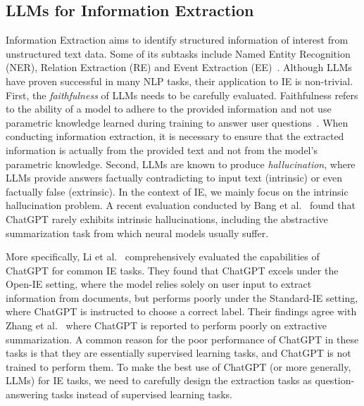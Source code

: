 \subsection{LLMs for Information Extraction}
Information Extraction aims to identify structured information of interest from unstructured text data.
Some of its subtasks include Named Entity Recognition (NER), Relation Extraction (RE) and Event Extraction (EE)~\cite{nasar2021named, xiang2019surveyee}.
Although LLMs have proven successful in many NLP tasks, their application to IE is non-trivial.
First, the \textit{faithfulness} of LLMs needs to be carefully evaluated.
Faithfulness refers to the ability of a model to adhere to the provided information and not use parametric knowledge learned during training to answer user questions~\cite{zhou2023contextfaithful}.
When conducting information extraction, it is necessary to ensure that the extracted information is actually from the provided text and not from the model's parametric knowledge.
Second, LLMs are known to produce \textit{hallucination}, where LLMs provide answers factually contradicting to input text (intrinsic) or even factually false (extrinsic). 
In the context of IE, we mainly focus on the intrinsic hallucination problem.
A recent evaluation conducted by Bang et al.~\cite{bang2023multitask} found that ChatGPT rarely exhibits intrinsic hallucinations, including the abstractive summarization task from which neural models usually suffer.

More specifically, Li et al.~\cite{li2023evaluateChatgpt} comprehensively evaluated the capabilities of ChatGPT for common IE tasks.
They found that ChatGPT excels under the Open-IE setting, where the model relies solely on user input to extract information from documents, but performs poorly under the Standard-IE setting, where ChatGPT is instructed to choose a correct label.
Their findings agree with Zhang et al.~\cite{zhang2023extractive} where ChatGPT is reported to perform poorly on extractive summarization.
A common reason for the poor performance of ChatGPT in these tasks is that they are essentially supervised learning tasks, and ChatGPT is not trained to perform them.
To make the best use of ChatGPT (or more generally, LLMs) for IE tasks, we need to carefully design the extraction tasks as question-answering tasks instead of supervised learning tasks.


